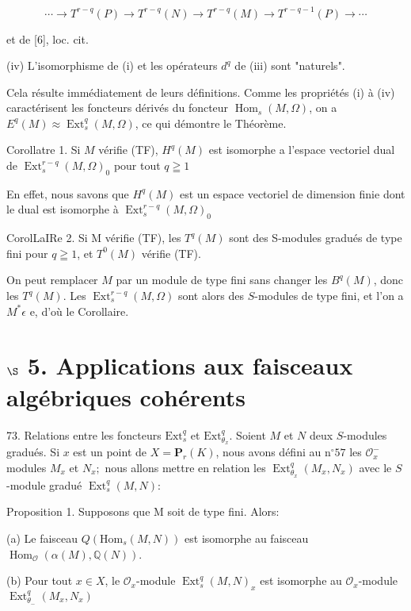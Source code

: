 $$
\cdots \rightarrow T^{r-q}(P) \rightarrow T^{r-q}(N) \rightarrow T^{r-q}(M) \rightarrow T^{r-q-1}(P) \rightarrow \cdots
$$

et de [6], loc. cit.

(iv) L'isomorphisme de (i) et les opérateurs $d^{q}$ de (iii) sont "naturels".

Cela résulte immédiatement de leurs définitions. Comme les propriétés (i) à (iv) caractérisent les foncteurs dérivés du foncteur $\operatorname{Hom}_{s}(M, \Omega)$, on a $E^{q}(M) \approx \operatorname{Ext}_{s}^{q}(M, \Omega)$, ce qui démontre le Théorème.

Corollatre 1. Si $M$ vérifie (TF), $H^{q}(M)$ est isomorphe a l'espace vectoriel dual de $\operatorname{Ext}_{s}^{r-q}(M, \Omega)_{0}$ pour tout $q \geqq 1$

En effet, nous savons que $H^{q}(M)$ est un espace vectoriel de dimension finie dont le dual est isomorphe à $\operatorname{Ext}_{s}^{r-q}(M, \Omega)_{0}$

CorolLaIRe 2. Si M vérifie (TF), les $T^{q}(M)$ sont des S-modules gradués de type fini pour $q \geqq 1$, et $T^{0}(M)$ vérifie (TF).

On peut remplacer $M$ par un module de type fini sans changer les $B^{q}(M)$, donc les $T^{q}(M)$. Les $\operatorname{Ext}_{s}^{r-q}(M, \Omega)$ sont alors des $S$-modules de type fini, et l'on a $M^{*} \epsilon$ e, d'où le Corollaire.

\section{$\S$ 5. Applications aux faisceaux algébriques cohérents}

73. Relations entre les foncteurs $\mathrm{Ext}_{s}^{q}$ et $\mathrm{Ext}_{\theta_{x}}^{q} .$ Soient $M$ et $N$ deux $S$-modules gradués. Si $x$ est un point de $X=\mathbf{P}_{r}(K)$, nous avons défini au $\mathrm{n}^{\circ} 57$ les $\mathcal{O}_{x}^{-}$ modules $M_{x}$ et $N_{x} ;$ nous allons mettre en relation les $\operatorname{Ext}_{\theta_{x}}^{q}\left(M_{x}, N_{x}\right)$ avec le $S$-module gradué $\operatorname{Ext}_{s}^{q}(M, N):$

Proposition 1. Supposons que M soit de type fini. Alors:

(a) Le faisceau $Q\left(\mathrm{Hom}_{s}(M, N)\right)$ est isomorphe au faisceau $\operatorname{Hom}_{\mathcal{O}}(\alpha(M), \mathbb{Q}(N))$.

(b) Pour tout $x \in X$, le $\mathcal{O}_{x}$-module $\operatorname{Ext}_{s}^{q}(M, N)_{x}$ est isomorphe au $\mathcal{O}_{x}$-module $\operatorname{Ext}_{\theta_{-}}^{q}\left(M_{x}, N_{x}\right)$

